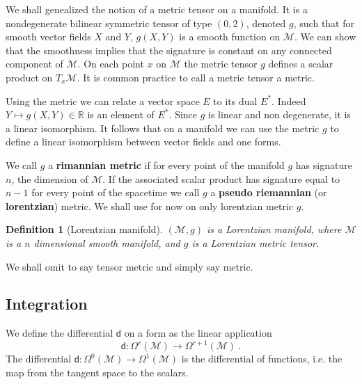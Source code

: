 \documentclass[11pt]{book}
\newcommand{\Mcal}{\mathcal{M}}
\newcommand{\Rbb}{\mathbb{R}}
\newcommand{\dsf}{\mathsf{d}}
\theoremstyle{break}
\newtheorem{definition}{Definition}[chapter]
\begin{document}
We shall genealized the notion of a metric tensor on a manifold. It is a nondegenerate bilinear symmetric tensor of type $(0,2)$, denoted $g$, such that for smooth vector fields $X$ and $Y$, $g(X,Y)$ is a smooth function on $\Mcal$. We can show that the smoothness implies that the signature is constant on any connected component of $\Mcal$. On each point $x$ on $\Mcal$ the metric tensor $g$ defines a scalar product on $T_x\Mcal$. It is common practice to call a metric tensor a metric.


Using the metric we can relate a vector space $E$ to its dual $E^\ast$. Indeed $Y \mapsto g(X,Y) \in \Rbb$ is an element of $E^\ast$. Since $g$ is linear and non degenerate, it is a linear isomorphism. It follows that on a manifold we can use the metric $g$ to define a linear isomorphism between vector fields and one forms. 


We call $g$ a \textbf{rimannian metric} if for every point of the manifold $g$ has signature $n$, the dimension of $\Mcal$. If the associated scalar product has signature equal to $n-1$ for every point of the spacetime we call $g$ a \textbf{pseudo riemannian} (or \textbf{lorentzian}) metric. We shall use for now on only lorentzian metric $g$.

\begin{definition}[Lorentzian manifold]\label{def:lorentzian_M}
$(\Mcal,g)$ is a Lorentzian manifold, where $\Mcal$ is a $n$ dimensional smooth manifold, and $g$ is a Lorentzian metric tensor.
\end{definition}


We shall omit to say tensor metric and simply say metric.


\subsection{Integration}
\label{p:INTEGRATION}


We define the differential $\dsf$ on a form as the linear application
%
\begin{equation*}
\dsf : \Omega^r(\Mcal) \to \Omega^{r+1}(\Mcal) \ .
\end{equation*}
%
The differential $\dsf : \Omega^0(\Mcal) \to \Omega^1(\Mcal)$ is the differential of functions, i.e. the map from the tangent space to the scalars.
\end{document}
